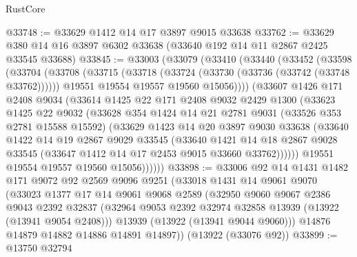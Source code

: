 \begin{lexlean}{RustCore}
\begin{coremodule}
@33748 := @33629 @1412 @14 @17 @3897 @9015 @33638
@33762 := @33629 @380 @14 @16 @3897 @6302 @33638 (@33640 @192 @14 @11 @2867 @2425 @33545 @33688)
@33845 := @33003
    (@33079
      (@33410
        (@33440
          (@33452
            (@33598
              (@33704
                (@33708
                  (@33715
                    (@33718 (@33724 (@33730 (@33736 (@33742 (@33748 @33762))))))
                    @19551
                    @19554
                    @19557
                    @19560
                    @15056))))
            (@33607
              @1426
              @171
              @2408
              @9034
              (@33614
                @1425
                @22
                @171
                @2408
                @9032
                @2429
                @1300
                (@33623
                  @1425
                  @22
                  @9032
                  (@33628
                    @354
                    @1424
                    @14
                    @21
                    @2781
                    @9031
                    (@33526 @353 @2781 @15588 @15592)
                    (@33629
                      @1423
                      @14
                      @20
                      @3897
                      @9030
                      @33638
                      (@33640
                        @1422
                        @14
                        @19
                        @2867
                        @9029
                        @33545
                        (@33640
                          @1421
                          @14
                          @18
                          @2867
                          @9028
                          @33545
                          (@33647 @1412 @14 @17 @2453 @9015 @33660 @33762))))))
                @19551
                @19554
                @19557
                @19560
                @15056))))))
@33898 := @33006
    @92
    @14
    @1431
    @1482
    @171
    @9072
    @92
    @2569
    @9096
    @9251
    (@33018
      @1431
      @14
      @9061
      @9070
      (@33023
        @1377
        @17
        @14
        @9061
        @9068
        @2589
        (@32950
          @9060
          @9067
          @2386
          @9043
          @2392
          @32837
          (@32964 @9053 @2392 @32974 @32858 @13939 (@13922 (@13941 @9054 @2408)))
          @13939
          (@13922 (@13941 @9044 @9060)))
        @14876
        @14879
        @14882
        @14886
        @14891
        @14897))
    (@13922 (@33076 @92))
@33899 := @13750 @32794

\end{coremodule}
\end{lexlean}
